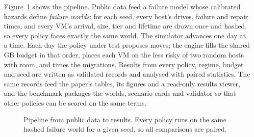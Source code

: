 \documentclass[pdflatex,sn-mathphys-num,iicol]{sn-jnl}
\theoremstyle{thmstyleone}%
\theoremstyle{thmstylethree}%
\begin{document}
Figure~\ref{fig:arch} shows the pipeline. Public data feed a failure model whose calibrated
hazards define \emph{failure worlds}: for each seed, every host's drives, failure and repair times,
and every VM's arrival, size, tier and lifetime are drawn once and hashed, so every policy faces
exactly the same world. The simulator advances one day at a time. Each day the policy under test
proposes moves; the engine fills the shared GB budget in that order, places each VM on the less
risky of two random hosts with room, and times the migrations. Results from every policy, regime,
budget and seed are written as validated records and analysed with paired statistics. The same
records feed the paper's tables, its figures and a read-only results viewer, and the benchmark
packages the worlds, scenario cards and validator so that other policies can be scored on the
same terms.

\begin{figure}[!t]\centering
{}
\caption{Pipeline from public data to results. Every policy runs on the same hashed failure world
for a given seed, so all comparisons are paired.}\label{fig:arch}
\end{figure}
\end{document}
